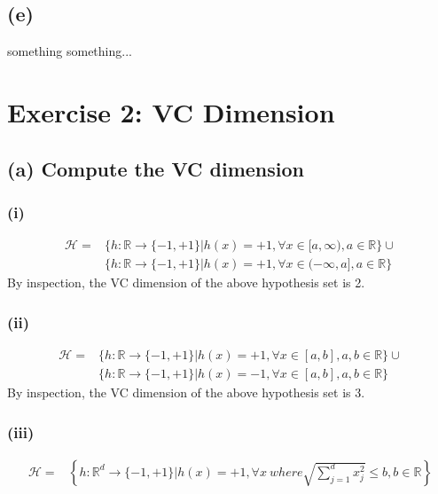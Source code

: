 \documentclass[11pt]{article}
\begin{document}
\subsection*{(e)}
something something...
\pagebreak
\section*{Exercise 2: VC Dimension}
\subsection*{(a) Compute the VC dimension}
\subsubsection*{(i)}	
\begin{equation}
\begin{split}
\mathcal{H}=&\{h:\mathbb{R}\rightarrow\{-1,+1\}|h(x)=+1,\forall x\in[a,\infty), a\in\mathbb{R}\} \cup \\
&\{h:\mathbb{R}\rightarrow\{-1,+1\}|h(x)=+1,\forall x\in(-\infty,a], a\in\mathbb{R}\}
\end{split}
\end{equation}
By inspection, the VC dimension of the above hypothesis set is 2.

\subsubsection*{(ii)}
\begin{equation}
\begin{split}
\mathcal{H}=&\{h:\mathbb{R}\rightarrow\{-1,+1\}|h(x)=+1,\forall x\in[a,b], a,b\in\mathbb{R}\} \cup \\
&\{h:\mathbb{R}\rightarrow\{-1,+1\}|h(x)=-1,\forall x\in[a,b], a,b\in\mathbb{R}\}
\end{split}
\end{equation}
By inspection, the VC dimension of the above hypothesis set is 3.

\subsubsection*{(iii)}
\begin{equation}
\begin{split}
\mathcal{H}=&\left\{h:\mathbb{R}^d\rightarrow\{-1,+1\}|h(x)=+1,\forall x\ where \sqrt{\sum_{j=1}^{d} x_j^2}\le b, b\in\mathbb{R}\right\}
\end{split}
\end{equation}
\end{document}
